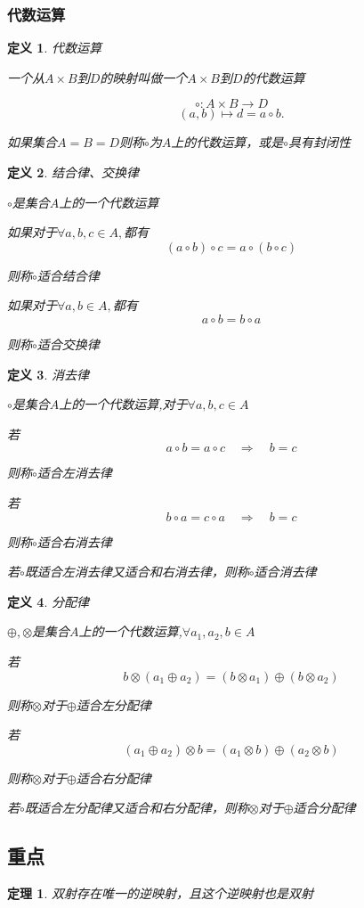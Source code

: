 \documentclass[a4paper]{ctexart}
\newtheorem{theorem}{定理}[section]
\newtheorem{definition}{定义}[subsection]
\begin{document}
		\subsubsection{代数运算}
	\begin{definition}
	代数运算
	
	一个从$A\times B$到$D$的映射叫做一个$A\times B$到$D$的代数运算
	
	\[\circ {:}A\times B \to D \]
	\[(a,b) \mapsto d = a\circ b. \]
	
	如果集合$A=B=D$则称$\circ$为$A$上的代数运算，或是$\circ$具有封闭性
	\end{definition}	
	\begin{definition}结合律、交换律
		
		$\circ$是集合$A$上的一个代数运算
		
		\item[(1)] 如果对于$\forall a,b,c\in A ,$都有\[(a\circ b)\circ c = a \circ (b\circ c)\]
		
		则称$\circ$适合结合律
		\item[(2)] 如果对于$\forall a,b\in A ,$都有\[a\circ b = b\circ a\]
		
		则称$\circ$适合交换律
	\end{definition}
	\begin{definition}
		消去律
		
		$\circ$是集合$A$上的一个代数运算,对于$\forall a,b,c\in A$
		
		\item[(1)] 若\[a\circ b = a \circ c \quad \Rightarrow \quad b=c\] 
		
		则称$\circ$适合左消去律
		\item[(2)]若\[b\circ a = c \circ a \quad \Rightarrow \quad b=c\]
		
		则称$\circ$适合右消去律
		\item[(3)]若$\circ$既适合左消去律又适合和右消去律，则称$\circ$适合消去律
	\end{definition}
	\begin{definition}
		分配律
		
		$\oplus,\otimes$是集合$A$上的一个代数运算,$\forall a_1,a_2,b\in A$
		
		\item[(1)] 若\[b\otimes(a_1\oplus a_2)  = (b\otimes a_1) \oplus (b\otimes a_2)\] 
		
		则称$\otimes$对于$ \oplus $适合左分配律
		\item[(2)]若\[(a_1\oplus a_2)\otimes b = (a_1\otimes b) \oplus (a_2\otimes b)\]
		
		则称$\otimes$对于$ \oplus $适合右分配律
		\item[(3)]若$\circ$既适合左分配律又适合和右分配律，则称$\otimes$对于$ \oplus $适合分配律
		
	\end{definition}

	
	
	\subsection{重点}
	\begin{theorem}
		双射存在唯一的逆映射，且这个逆映射也是双射
	\end{theorem}
	
\end{document}
